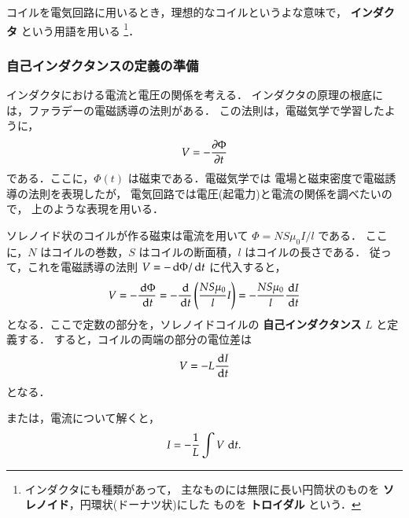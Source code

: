         コイルを電気回路に用いるとき，理想的なコイルというよな意味で，
        \textbf{インダクタ} という用語を用いる
            \footnote{
                インダクタにも種類があって，
                主なものには無限に長い円筒状のものを \textbf{ソレノイド}，円環状(ドーナツ状)にした
                ものを \textbf{トロイダル} という．
            }．

    \subsubsection{自己インダクタンスの定義の準備}
        インダクタにおける電流と電圧の関係を考える．
        インダクタの原理の根底には，ファラデーの電磁誘導の法則がある．
        この法則は，電磁気学で学習したように，
            \begin{align}
                V=-\frac{\partial \Phi }{\partial t}
            \end{align}
        である．ここに，$\Phi (t)$ は磁束である．電磁気学では
        電場と磁束密度で電磁誘導の法則を表現したが，
        電気回路では電圧(起電力)と電流の関係を調べたいので，
        上のような表現を用いる．

        ソレノイド状のコイルが作る磁束は電流を用いて $\Phi=NS\mu_{0}I/l$ である．
        ここに，$N$ はコイルの巻数，$S$ はコイルの断面積，$l$ はコイルの長さである．
        従って，これを電磁誘導の法則 $V=-\,\mathrm{d} \Phi/\,\mathrm{d} t$ に代入すると，
            \begin{align}
                V=-\frac{\,\mathrm{d} \Phi}{\,\mathrm{d} t}=-\frac{\,\mathrm{d} }{\,\mathrm{d} t}\left( \frac{NS\mu_{0}}{l}I \right) =-\frac{NS\mu_{0}}{l} \frac{\,\mathrm{d} I}{\,\mathrm{d} t}
            \end{align}
        となる．ここで定数の部分を，ソレノイドコイルの \textbf{自己インダクタンス} $L$ と定義する．
        すると，コイルの両端の部分の電位差は
            \begin{align}\label{eq:L_Define}
                V=-L\frac{\df I}{\df t}
            \end{align}
        となる．

        または，電流について解くと，
            \begin{align}
                I=-\frac{1}{L} \int V\,\,\mathrm{d} t.
            \end{align}

